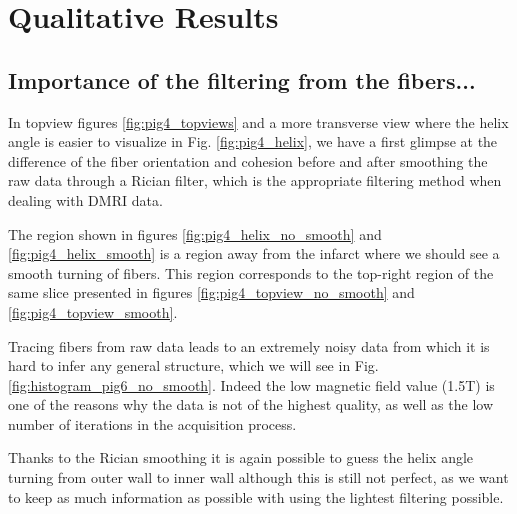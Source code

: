\section{Qualitative Results}

\subsection{Importance of the filtering from the fibers...}

In topview figures \ref{fig:pig4_topviews} and a more transverse view where the helix angle is easier to visualize in Fig. \ref{fig:pig4_helix}, we have a first glimpse at the difference of the fiber orientation and cohesion before and after smoothing the raw data through a Rician filter, which is the appropriate filtering method when dealing with DMRI data.

The region shown in figures \ref{fig:pig4_helix_no_smooth} and \ref{fig:pig4_helix_smooth} is a region away from the infarct where we should see a smooth turning of fibers. This region corresponds to the top-right region of the same slice presented in figures \ref{fig:pig4_topview_no_smooth} and \ref{fig:pig4_topview_smooth}.

Tracing fibers from raw data leads to an extremely noisy data from which it is hard to infer any general structure, which we will see in Fig. \ref{fig:histogram_pig6_no_smooth}. Indeed the low magnetic field value (1.5T) is one of the reasons why the data is not of the highest quality, as well as the low number of iterations in the acquisition process.

Thanks to the Rician smoothing it is again possible to guess the helix angle turning from outer wall to inner wall although this is still not perfect, as we want to keep as much information as possible with using the lightest filtering possible.


